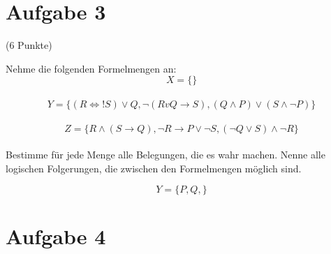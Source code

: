 \documentclass{exam}
\newcommand{\Punkte}[1]{\begin{flushright}(#1 Punkte)\end{flushright}}
\begin{document}
	
	\clearpage
	\section{Aufgabe 3}
	
	\Punkte{6}
	
	Nehme die folgenden Formelmengen an:\\
	$$ X = \{  \} $$\\
	$$ Y = \{ (R \iff !S) \lor Q, \lnot (R v Q \rightarrow S), (Q \land P) \lor (S \land \lnot P) \} $$\\
	$$ Z = \{ R \land (S \rightarrow Q), \lnot R \rightarrow P \lor \lnot S, (\lnot Q \lor S) \land \lnot R \} $$\\
	Bestimme für jede Menge alle Belegungen, die es wahr machen. Nenne alle logischen Folgerungen, die zwischen den Formelmengen möglich sind.
	
	
	$$ Y = \{ P,Q, \} $$ 
	
	\clearpage
	\section{Aufgabe 4}
	
\end{document}
